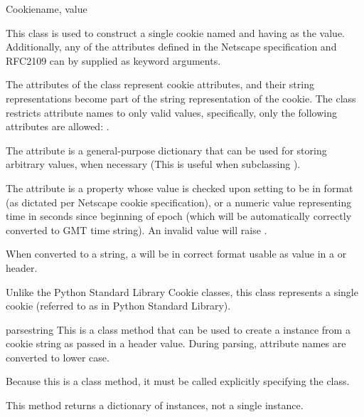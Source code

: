 \begin{classdesc}{Cookie}{name, value}

  This class is used to construct a single cookie named 
  and having  as the value. Additionally, any of the 
  attributes defined in the Netscape specification and RFC2109 can by
  supplied as keyword arguments.

  The attributes of the class represent cookie attributes, and their
  string representations become part of the string representation of
  the cookie. The  class restricts attribute names to
  only valid values, specifically, only the following attributes are
  allowed: .

  The  attribute is a general-purpose dictionary that
  can be used for storing arbitrary values, when necessary (This is
  useful when subclassing ).

  The  attribute is a property whose value is checked
  upon setting to be in format 
  (as dictated per Netscape cookie specification), or a numeric value
  representing time in seconds since beginning of epoch (which will be
  automatically correctly converted to GMT time string). An invalid
   value will raise .

  When converted to a string, a  will be in correct
  format usable as value in a  or 
  header.

  \begin{notice}
    Unlike the Python Standard Library Cookie classes, this
    class represents a single cookie (referred to as  in
    Python Standard Library).
  \end{notice}

  \begin{methoddesc}[Cookie]{parse}{string}
    This is a class method that can be used to create a 
    instance from a cookie string  as passed in a header
    value. During parsing, attribute names are converted to lower
    case.

    Because this is a class method, it must be called explicitly
    specifying the class.

    This method returns a dictionary of  instances, not
    a single  instance.


\end{methoddesc}
\end{classdesc}
